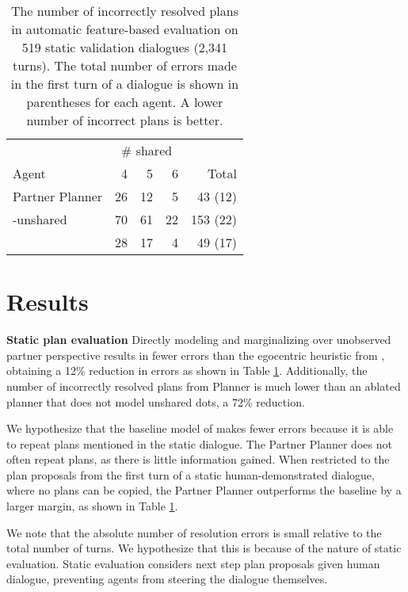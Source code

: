 \documentclass[11pt]{article}
\begin{document}
\begin{table}[!t]
\centering
\begin{tabular}{lrrrr}
\toprule
& \multicolumn{3}{c}{\# shared} &\\
\cmidrule{2-4}
Agent                   & 4  & 5  & 6  & Total\\
\midrule
Partner Planner         & 26 & 12 & 5  & 43  (12)\\
\quad -unshared         & 70 & 61 & 22 & 153 (22)\\
\citet{fried}           & 28 & 17 & 4  & 49  (17)\\
\bottomrule
\end{tabular}
\caption{\label{tbl:static-plans}
The number of incorrectly resolved plans in
automatic feature-based evaluation on 519 static validation dialogues
(2,341 turns).
The total number of errors made in the first turn of a dialogue is shown in parentheses for each agent.
A lower number of incorrect plans is better.
}
\end{table}

\section{Results}
\textbf{Static plan evaluation}
Directly modeling and marginalizing over unobserved partner perspective results in fewer
errors than the egocentric heuristic from \citet{fried}, obtaining a 12\% reduction in errors as shown in Table \ref{tbl:static-plans}.
Additionally, the number of incorrectly resolved plans from Planner is much lower than an ablated planner that does not model unshared dots, a 72\% reduction.

We hypothesize that the baseline model of \citet{fried} makes fewer errors because it is able to repeat plans mentioned in the static dialogue.
The Partner Planner does not often repeat plans, as there is little information gained.
When restricted to the plan proposals from the first turn of a static human-demonstrated dialogue, where no plans can be copied, the Partner Planner outperforms the baseline by a larger margin, as shown in Table \ref{tbl:static-plans}.

We note that the absolute number of resolution errors is small relative to the total number of turns.
We hypothesize that this is because of the nature of static evaluation.
Static evaluation considers next step plan proposals given human dialogue,
preventing agents from steering the dialogue themselves.
\end{document}
